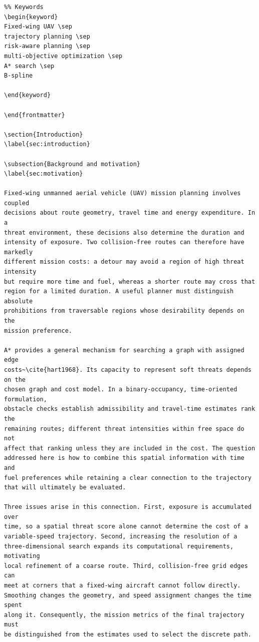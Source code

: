 \documentclass[12pt]{article}
\begin{document}
\begin{verbatim}
%% Keywords
\begin{keyword}
Fixed-wing UAV \sep
trajectory planning \sep
risk-aware planning \sep
multi-objective optimization \sep
A* search \sep
B-spline

\end{keyword}

\end{frontmatter}

\section{Introduction}
\label{sec:introduction}

\subsection{Background and motivation}
\label{sec:motivation}

Fixed-wing unmanned aerial vehicle (UAV) mission planning involves coupled
decisions about route geometry, travel time and energy expenditure. In a
threat environment, these decisions also determine the duration and
intensity of exposure. Two collision-free routes can therefore have markedly
different mission costs: a detour may avoid a region of high threat intensity
but require more time and fuel, whereas a shorter route may cross that
region for a limited duration. A useful planner must distinguish absolute
prohibitions from traversable regions whose desirability depends on the
mission preference.

A* provides a general mechanism for searching a graph with assigned edge
costs~\cite{hart1968}. Its capacity to represent soft threats depends on the
chosen graph and cost model. In a binary-occupancy, time-oriented formulation,
obstacle checks establish admissibility and travel-time estimates rank the
remaining routes; different threat intensities within free space do not
affect that ranking unless they are included in the cost. The question
addressed here is how to combine this spatial information with time and
fuel preferences while retaining a clear connection to the trajectory
that will ultimately be evaluated.

Three issues arise in this connection. First, exposure is accumulated over
time, so a spatial threat score alone cannot determine the cost of a
variable-speed trajectory. Second, increasing the resolution of a
three-dimensional search expands its computational requirements, motivating
local refinement of a coarse route. Third, collision-free grid edges can
meet at corners that a fixed-wing aircraft cannot follow directly.
Smoothing changes the geometry, and speed assignment changes the time spent
along it. Consequently, the mission metrics of the final trajectory must
be distinguished from the estimates used to select the discrete path.


\end{verbatim}
\end{document}
